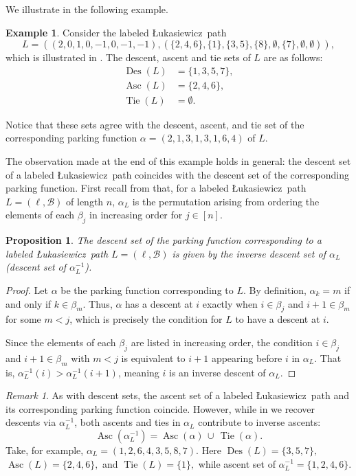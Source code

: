 \documentclass[12pt,reqno]{amsart}
\newtheorem{proposition}[theorem]{Proposition}
\theoremstyle{definition}
\newtheorem{example}{Example}
\theoremstyle{remark}
\newtheorem{remark}{Remark}
\DeclareMathOperator{\Des}{Des}
\DeclareMathOperator{\Asc}{Asc}
\DeclareMathOperator{\Tie}{Tie}
\newcommand{\Luka}{\L ukasiewicz}
\begin{document}
We illustrate  in the following example.

\begin{example} 
Consider the labeled \Luka~path 
$$L=((2,0,1,0,-1,0,-1,-1),(\{2,4,6\},\{1\},\{3,5\},\{8\},\emptyset,\{7\},\emptyset,\emptyset)),$$
which is illustrated in . 
The descent, ascent and tie sets of $L$ are as follows:
\begin{align*}
    \Des(L)&=\{1,3,5,7\},\\
    \Asc(L)&=\{2,4,6\},\\
    \Tie(L)&=\emptyset.
\end{align*}

Notice that these sets agree with the  descent, ascent, and tie set of the corresponding parking function $\alpha=(2,1,3,1,3,1,6,4)$ of $L$.
\end{example}


The observation made at the end of this example holds in general: the descent set of a labeled \Luka~path coincides with the descent set of the corresponding parking function. First recall from  that, for a labeled \Luka~path $L=(\ell,\mathcal{B})$ of length $n$,  $\alpha_L$ is the permutation arising from ordering the elements of each $\beta_j$ in increasing order for $j \in [n]$. 


\begin{proposition}\label{lem:descents agree}
The descent set of the parking function corresponding to a labeled \Luka~path $L=(\ell, \mathcal{B})$ is given by the inverse descent set of $\alpha_L$ (descent set of $\alpha_L^{-1}$). 
\end{proposition}
\begin{proof}
Let $\alpha$ be the parking function corresponding to $L$.  
By definition, $\alpha_k = m$ if and only if $k \in \beta_m$.  
Thus, $\alpha$ has a descent at $i$ exactly when $i \in \beta_j$ and $i+1 \in \beta_m$ for some $m < j$, which is precisely the condition for $L$ to have a descent at $i$.  

Since the elements of each $\beta_j$ are listed in increasing order, the condition $i \in \beta_j$ and $i+1 \in \beta_m$ with $m < j$ is equivalent to $i+1$ appearing before $i$ in $\alpha_L$.  
That is, $\alpha_L^{-1}(i) > \alpha_L^{-1}(i+1)$, meaning $i$ is an inverse descent of $\alpha_L$.  
\end{proof}


\begin{remark}
As with descent sets, the ascent set of a labeled \Luka~path and its corresponding parking function coincide. However, while in  we recover descents via $\alpha_L^{-1}$, both ascents and ties in $\alpha_L$ contribute to inverse ascents:
\[
\Asc(\alpha_L^{-1})=\Asc(\alpha)\,\cup\,\Tie(\alpha).
\] 
Take, for example, $\alpha_L=(1,2,6,4,3,5,8,7).$ Here $\Des(L)=\{3,5,7\},$ $\Asc(L)=\{2,4,6\},$ and $\Tie(L)=\{1\},$ while ascent set of $\alpha_L^{-1}=\{1, 2, 4, 6\}.$
\end{remark}
\end{document}
